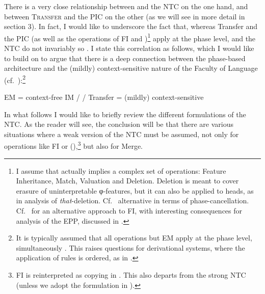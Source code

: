 \documentclass[output=paper]{langsci/langscibook}
\begin{document}
There is a very close relationship between  and the \gls{NTC} on the one
hand, and between \textsc{Transfer} and the \gls{PIC} on the other (as we will
see in more detail in section 3). In fact, I would like to underscore the fact
that, whereas Transfer and the \gls{PIC} (as well as the operations of \gls{FI}
and )\footnote{I assume that  actually implies a complex set of
    operations: Feature Inheritance, Match, Valuation and Deletion. Deletion is
    meant to cover erasure of uninterpretable φ-features, but it can also be
    applied to heads, as in  analysis of
    \emph{that}-deletion.  Cf.~\citet{EKS2016} alternative in terms of
    phase-cancellation. Cf.~\citet{Gallego2014} for an alternative approach to
\gls{FI}, with interesting consequences for   analysis of
the \gls{EPP}, discussed in \citet{Gallego2017}.} apply at the
phase level,  and the \gls{NTC} do not invariably so
\parencites[17]{Chomsky2007}[143]{Chomsky2008}[40, 42]{Chomsky2013}. I state
this correlation as follows, which I would like to build on to argue that there
is a deep connection between the phase-based architecture and the (mildly)
context-sensitive nature of the Faculty of Language
(cf.~\citealt{Chomsky1956,Uriagereka2008}):\footnote{It is typically assumed
    that all operations but \gls{EM} apply at the phase level,
    simultaneously
    \parencites[116]{Chomsky2004}[19]{Chomsky2005}[17]{Chomsky2007}[155]{Chomsky2008}.
    This raises questions for derivational systems, where the application of
rules is ordered, as in \citet{Chomsky2015}.}

\ea%
    \label{ex:key:34.3}
    \ea \gls{EM} = context-free
    \ex {}\gls{IM} /  / Transfer = (mildly) context-sensitive
    \z
\z

In what follows I would like to briefly review the different formulations of
the \gls{NTC}. As the reader will see, the conclusion will be that there are
various situations where a weak version of the \gls{NTC} must be assumed, not only for operations like \gls{FI} or
 (\citealt[19, fn.\ 26]{Chomsky2007}),\footnote{\gls{FI} is
    reinterpreted as copying in \citet[47]{Chomsky2013}. This also departs from
    the strong \gls{NTC} (unless we adopt the
formulation in \citealt{Gallego2014}).\label{fn:34.8}} but also for Merge.
\end{document}
